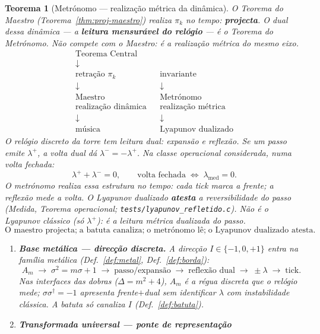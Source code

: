 \documentclass[11pt,a4paper]{article}
\newtheorem{teorema}{Teorema}
\newcommand{\code}[1]{\texttt{#1}}
\begin{document}
\begin{teorema}[Metrónomo --- realização métrica da dinâmica]\label{thm:metronomo}
O Teorema do Maestro (Teorema~\ref{thm:proj-maestro}) realiza $\pi_k$
no tempo: \textbf{projecta}. O dual dessa dinâmica --- a
\textbf{leitura mensurável do relógio} --- é o Teorema do Metrónomo.
Não compete com o Maestro: é a realização métrica do \emph{mesmo} eixo.
\[
\boxed{
\begin{array}{ccc}
\text{Teorema Central} & & \\
\downarrow & & \\
\text{retração }\pi_k & & \text{invariante} \\
\downarrow & & \downarrow \\
\text{Maestro} & & \text{Metrónomo} \\
\text{realização dinâmica} & & \text{realização métrica} \\
\downarrow & & \downarrow \\
\text{música} & & \text{Lyapunov dualizado}
\end{array}
}
\]
O relógio discreto da torre tem leitura dual: expansão e reflexão.
Se um passo emite $\lambda^{+}$, a volta dual dá $\lambda^{-}=-\lambda^{+}$.
Na classe operacional considerada, numa volta fechada:
\[
\boxed{\lambda^{+} + \lambda^{-} = 0},
\qquad
\boxed{\text{volta fechada}\;\Longleftrightarrow\;\lambda_{\mathrm{med}}=0}.
\]
O metrónomo realiza essa estrutura no tempo: cada tick marca a frente;
a reflexão mede a volta. O Lyapunov dualizado \textbf{atesta} a
reversibilidade do passo (\emph{Medida}, Teorema operacional;
\code{tests/lyapunov\_refletido.c}). Não é o Lyapunov clássico
(só $\lambda^{+}$): é a leitura métrica dualizada do passo.
\[
\boxed{
\text{O maestro projecta;}
\;
\text{a batuta canaliza;}
\;
\text{o metrónomo lê;}
\;
\text{o Lyapunov dualizado atesta.}
}
\]
\begin{enumerate}
\item \textbf{Base metálica --- direcção discreta.} A direcção
$I\in\{-1,0,+1\}$ entra na família metálica
(Def.~\ref{def:metal}, Def.~\ref{def:borda}):
\[
A_m
\;\longrightarrow\;
\sigma^{2}=m\sigma+1
\;\longrightarrow\;
\text{passo/expansão}
\;\longrightarrow\;
\text{reflexão dual}
\;\longrightarrow\;
\pm\lambda
\;\longrightarrow\;
\text{tick}.
\]
Nas interfaces das dobras ($\Delta=m^{2}+4$), $A_m$ é a régua discreta
que o relógio mede; $\sigma\sigma^{\dagger}=-1$ apresenta frente$+$dual
sem identificar $\lambda$ com instabilidade clássica. A batuta só
canaliza $I$ (Def.~\ref{def:batuta}).
\item \textbf{Transformada universal --- ponte de representação}

\end{enumerate}
\end{teorema}
\end{document}

